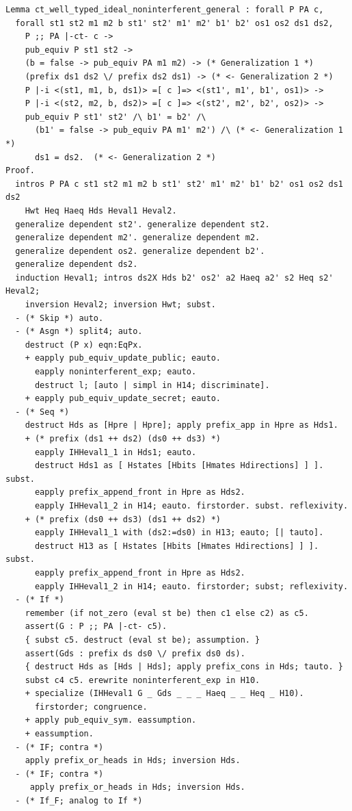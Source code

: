 \documentclass[12pt]{report}
\begin{document}
\begin{verbatim}
Lemma ct_well_typed_ideal_noninterferent_general : forall P PA c,
  forall st1 st2 m1 m2 b st1' st2' m1' m2' b1' b2' os1 os2 ds1 ds2,
    P ;; PA |-ct- c ->
    pub_equiv P st1 st2 ->
    (b = false -> pub_equiv PA m1 m2) -> (* Generalization 1 *)
    (prefix ds1 ds2 \/ prefix ds2 ds1) -> (* <- Generalization 2 *)
    P |-i <(st1, m1, b, ds1)> =[ c ]=> <(st1', m1', b1', os1)> ->
    P |-i <(st2, m2, b, ds2)> =[ c ]=> <(st2', m2', b2', os2)> ->
    pub_equiv P st1' st2' /\ b1' = b2' /\
      (b1' = false -> pub_equiv PA m1' m2') /\ (* <- Generalization 1 *)
      ds1 = ds2.  (* <- Generalization 2 *)
Proof.
  intros P PA c st1 st2 m1 m2 b st1' st2' m1' m2' b1' b2' os1 os2 ds1 ds2
    Hwt Heq Haeq Hds Heval1 Heval2.
  generalize dependent st2'. generalize dependent st2.
  generalize dependent m2'. generalize dependent m2.
  generalize dependent os2. generalize dependent b2'.
  generalize dependent ds2.
  induction Heval1; intros ds2X Hds b2' os2' a2 Haeq a2' s2 Heq s2' Heval2;
    inversion Heval2; inversion Hwt; subst.
  - (* Skip *) auto.
  - (* Asgn *) split4; auto.
    destruct (P x) eqn:EqPx.
    + eapply pub_equiv_update_public; eauto.
      eapply noninterferent_exp; eauto.
      destruct l; [auto | simpl in H14; discriminate].
    + eapply pub_equiv_update_secret; eauto.
  - (* Seq *)
    destruct Hds as [Hpre | Hpre]; apply prefix_app in Hpre as Hds1.
    + (* prefix (ds1 ++ ds2) (ds0 ++ ds3) *)
      eapply IHHeval1_1 in Hds1; eauto.
      destruct Hds1 as [ Hstates [Hbits [Hmates Hdirections] ] ]. subst.
      eapply prefix_append_front in Hpre as Hds2.
      eapply IHHeval1_2 in H14; eauto. firstorder. subst. reflexivity.
    + (* prefix (ds0 ++ ds3) (ds1 ++ ds2) *)
      eapply IHHeval1_1 with (ds2:=ds0) in H13; eauto; [| tauto].
      destruct H13 as [ Hstates [Hbits [Hmates Hdirections] ] ]. subst.
      eapply prefix_append_front in Hpre as Hds2.
      eapply IHHeval1_2 in H14; eauto. firstorder; subst; reflexivity.
  - (* If *)
    remember (if not_zero (eval st be) then c1 else c2) as c5.
    assert(G : P ;; PA |-ct- c5).
    { subst c5. destruct (eval st be); assumption. }
    assert(Gds : prefix ds ds0 \/ prefix ds0 ds).
    { destruct Hds as [Hds | Hds]; apply prefix_cons in Hds; tauto. }
    subst c4 c5. erewrite noninterferent_exp in H10.
    + specialize (IHHeval1 G _ Gds _ _ _ Haeq _ _ Heq _ H10).
      firstorder; congruence.
    + apply pub_equiv_sym. eassumption.
    + eassumption.
  - (* IF; contra *)
    apply prefix_or_heads in Hds; inversion Hds.
  - (* IF; contra *)
     apply prefix_or_heads in Hds; inversion Hds.
  - (* If_F; analog to If *)

\end{verbatim}
\end{document}
